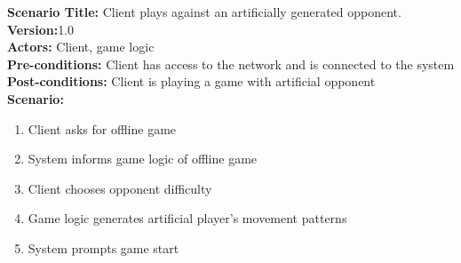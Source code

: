 \documentclass[letterpaper,12pt]{article}
\begin{document}
\noindent \textbf{Scenario Title:} Client plays against an artificially generated opponent.\\
\textbf{Version:}1.0\\
\textbf{Actors:} Client, game logic\\
\textbf{Pre-conditions:} Client has access to the network and is connected to the system\\
\textbf{Post-conditions:} Client is playing a game with artificial opponent\\
\textbf{Scenario:}
\begin{enumerate}
\item Client asks for offline game
\item System informs game logic of offline game
\item Client chooses opponent difficulty
\item Game logic generates artificial player's movement patterns
\item System prompts game start
\end{enumerate}


\end{document}
